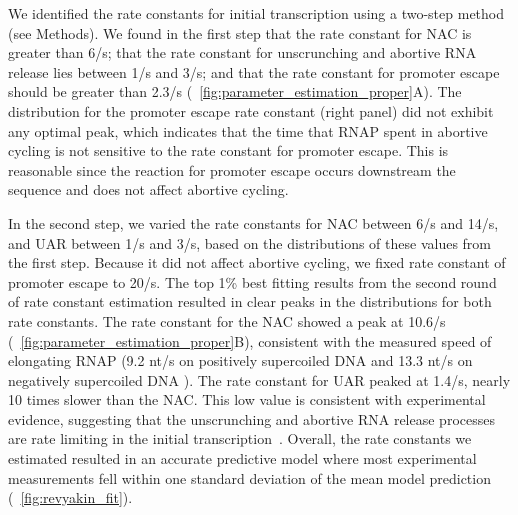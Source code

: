 %

We identified the rate constants for initial transcription using a two-step
method (see Methods). We found in the first step that the rate constant for
NAC is greater than 6/s; that the rate constant for unscrunching and abortive
RNA release lies between 1/s and 3/s; and that the rate constant for promoter
escape should be greater than 2.3/s
(\FIG~\ref{fig:parameter_estimation_proper}A). The distribution for the
promoter escape rate constant (right panel) did not exhibit any optimal peak,
which indicates that the time that RNAP spent in abortive cycling is not
sensitive to the rate constant for promoter escape. This is reasonable since
the reaction for promoter escape occurs downstream the sequence and does not
affect abortive cycling.   

In the second step, we varied the rate constants for NAC between 6/s and 14/s,
and UAR between 1/s and 3/s, based on the distributions of these
values from the first step. Because it did not affect abortive cycling,
we fixed rate constant of promoter escape to 20/s. The top 1\% best fitting
results from the second round of rate constant estimation resulted in clear
peaks in the distributions for both rate constants. The rate constant for the
NAC showed a peak at 10.6/s (\FIG~\ref{fig:parameter_estimation_proper}B),
consistent with the measured speed of elongating RNAP (9.2 nt/s on positively
supercoiled DNA and 13.3 nt/s on negatively supercoiled DNA
\cite{revyakin_abortive_2006}). The rate constant for UAR peaked at 1.4/s,
nearly 10 times slower than the NAC. This low value is consistent with
experimental evidence, suggesting that the unscrunching and abortive RNA
release processes are rate limiting in the initial
transcription~\cite{revyakin_abortive_2006, margeat_direct_2006}. Overall, the
rate constants we estimated resulted in an accurate predictive model where
most experimental measurements fell within one standard deviation of the mean
model prediction (\FIG~\ref{fig:revyakin_fit}). 


